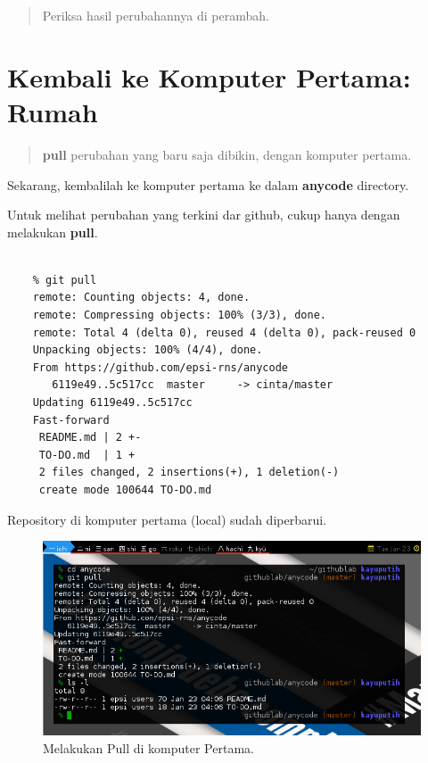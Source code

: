 \documentclass{article}
\begin{document}
\begin{quote}
Periksa hasil perubahannya di perambah.
\end{quote}

\newpage

\section{Kembali ke Komputer Pertama: Rumah}

\begin{quote}
\textbf{pull} perubahan yang baru saja dibikin, dengan komputer pertama.
\end{quote}

Sekarang, kembalilah ke komputer pertama ke dalam \textbf{anycode} directory.

Untuk melihat perubahan yang terkini dar github, cukup hanya dengan melakukan
\textbf{pull}.

\begin{lstlisting}[style=BashInputStyle]
    % cd anycode

    % git pull
    remote: Counting objects: 4, done.
    remote: Compressing objects: 100% (3/3), done.
    remote: Total 4 (delta 0), reused 4 (delta 0), pack-reused 0
    Unpacking objects: 100% (4/4), done.
    From https://github.com/epsi-rns/anycode
       6119e49..5c517cc  master     -> cinta/master
    Updating 6119e49..5c517cc
    Fast-forward
     README.md | 2 +-
     TO-DO.md  | 1 +
     2 files changed, 2 insertions(+), 1 deletion(-)
     create mode 100644 TO-DO.md
\end{lstlisting}

Repository di komputer pertama (local) sudah diperbarui.


\begin{figure}[H]
  \includegraphics[width=\linewidth]{gitcli-first-pull.png}
  \caption{Melakukan Pull di komputer Pertama.}
  \label{fig:git.first.pull}
\end{figure}
\end{document}
